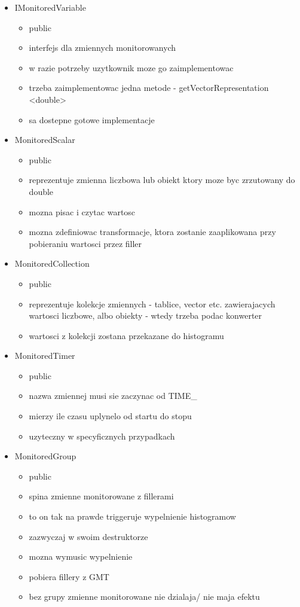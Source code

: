 \begin{itemize}
\item IMonitoredVariable
	\begin{itemize}
	\item public
	\item interfejs dla zmiennych monitorowanych
	\item w razie potrzeby uzytkownik moze go zaimplementowac
	\item trzeba zaimplementowac jedna metode - getVectorRepresentation <double>
	\item sa dostepne gotowe implementacje
	\end{itemize}
\item MonitoredScalar
	\begin{itemize}
	\item public
	\item reprezentuje zmienna liczbowa lub obiekt ktory moze byc zrzutowany do double
	\item mozna pisac i czytac wartosc
	\item mozna zdefiniowac transformacje, ktora zostanie zaaplikowana przy pobieraniu wartosci przez filler
	\end{itemize}
\item MonitoredCollection
	\begin{itemize}
	\item public
	\item reprezentuje kolekcje zmiennych - tablice, vector etc. zawierajacych wartosci liczbowe, albo obiekty - wtedy trzeba podac konwerter
	\item wartosci z kolekcji zostana przekazane do histogramu
	\end{itemize}
\item MonitoredTimer
	\begin{itemize}
	\item public
	\item nazwa zmiennej musi sie zaczynac od TIME\_
	\item mierzy ile czasu uplynelo od startu do stopu
	\item uzyteczny w specyficznych przypadkach
	\end{itemize}
\item MonitoredGroup
	\begin{itemize}
	\item public
	\item spina zmienne monitorowane z fillerami
	\item to on tak na prawde triggeruje wypelnienie histogramow
	\item zazwyczaj w swoim destruktorze
	\item mozna wymusic wypelnienie
	\item pobiera fillery z GMT
	\item bez grupy zmienne monitorowane nie dzialaja/ nie maja efektu
	\end{itemize}
\end{itemize}

